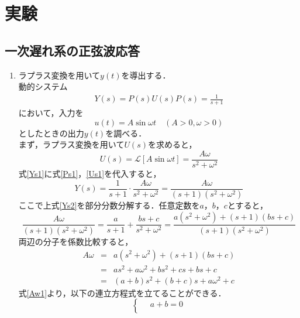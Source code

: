 \documentclass[a4paper,11pt]{jsarticle}
\begin{document}
\section{実験}
  \subsection{一次遅れ系の正弦波応答}
  \begin{enumerate}
    \item ラプラス変換を用いて$y(t)$を導出する．\cite{junbi2}\\
      動的システム\\
      \begin{eqnarray}
        Y(s) = P(s)U(s) \label{Ys1}
        P(s)=\frac{1}{s+1} \label{Ps1}
      \end{eqnarray}
      において，入力を\\
      \[u(t)=A\sin{\omega t} \quad (A>0, \omega>0)\]
      としたときの出力$y(t)$を調べる．\\
      まず，ラプラス変換を用いて$U(s)$を求めると，
      \begin{equation}
        U(s) = \mathcal{L}[A\sin{\omega t}] = \frac{A\omega}{s^2+\omega^2} \label{Us1}
      \end{equation}
      式\ref{Ys1}に式\ref{Ps1}，\ref{Us1}を代入すると，
      \begin{equation}
        Y(s) = \frac{1}{s+1}\cdot \frac{A\omega}{s^2+\omega^2}=\frac{A\omega}{(s+1)(s^2+\omega^2)} \label{Ys2}
      \end{equation}
      ここで上式\ref{Ys2}を部分分数分解する．任意定数を$a$，$b$，$c$とすると，
      \begin{equation}
        \frac{A\omega}{(s+1)(s^2+\omega^2)} = \frac{a}{s+1}+\frac{bs+c}{s^2+\omega^2}=\frac{a(s^2+\omega^2)+(s+1)(bs+c)}{(s+1)(s^2+\omega^2)}\nonumber
      \end{equation}
      両辺の分子を係数比較すると，
      \begin{eqnarray}
        A\omega &=& a(s^2+\omega^2)+(s+1)(bs+c)\\ \nonumber
                &=& as^2+a\omega^2+bs^2+cs+bs+c \\ \nonumber
                &=& (a+b)s^2 + (b+c)s + a\omega^2+c \label{Aw1}
      \end{eqnarray}
      式\ref{Aw1}より，以下の連立方程式を立てることができる．
      \begin{equation}
        \left\{ \,
            \begin{aligned}
            & a + b = 0  \\

\end{aligned}
\end{equation}
\end{enumerate}
\end{document}
